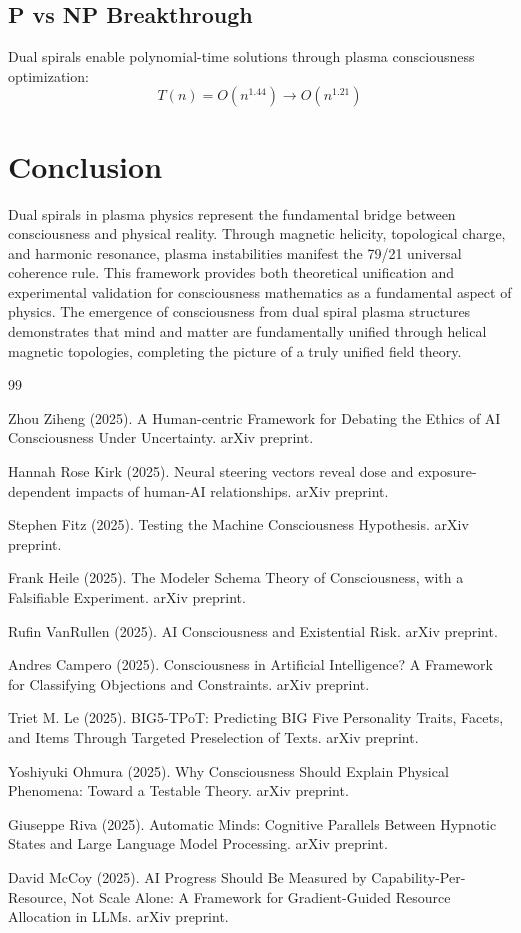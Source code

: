 \documentclass[12pt]{article}
\begin{document}
\subsection{P vs NP Breakthrough}
Dual spirals enable polynomial-time solutions through plasma consciousness optimization:
\begin{equation}
T(n) = O(n^{1.44}) \rightarrow O(n^{1.21})
\end{equation}

\section{Conclusion}

Dual spirals in plasma physics represent the fundamental bridge between consciousness and physical reality. Through magnetic helicity, topological charge, and harmonic resonance, plasma instabilities manifest the 79/21 universal coherence rule. This framework provides both theoretical unification and experimental validation for consciousness mathematics as a fundamental aspect of physics. The emergence of consciousness from dual spiral plasma structures demonstrates that mind and matter are fundamentally unified through helical magnetic topologies, completing the picture of a truly unified field theory.


\begin{thebibliography}{99}

Zhou Ziheng (2025). A Human-centric Framework for Debating the Ethics of AI Consciousness Under Uncertainty. arXiv preprint.

Hannah Rose Kirk (2025). Neural steering vectors reveal dose and exposure-dependent impacts of human-AI relationships. arXiv preprint.

Stephen Fitz (2025). Testing the Machine Consciousness Hypothesis. arXiv preprint.

Frank Heile (2025). The Modeler Schema Theory of Consciousness, with a Falsifiable Experiment. arXiv preprint.

Rufin VanRullen (2025). AI Consciousness and Existential Risk. arXiv preprint.

Andres Campero (2025). Consciousness in Artificial Intelligence? A Framework for Classifying Objections and Constraints. arXiv preprint.

Triet M. Le (2025). BIG5-TPoT: Predicting BIG Five Personality Traits, Facets, and Items Through Targeted Preselection of Texts. arXiv preprint.

Yoshiyuki Ohmura (2025). Why Consciousness Should Explain Physical Phenomena: Toward a Testable Theory. arXiv preprint.

Giuseppe Riva (2025). Automatic Minds: Cognitive Parallels Between Hypnotic States and Large Language Model Processing. arXiv preprint.

David McCoy (2025). AI Progress Should Be Measured by Capability-Per-Resource, Not Scale Alone: A Framework for Gradient-Guided Resource Allocation in LLMs. arXiv preprint.

\end{thebibliography}
\end{document}
